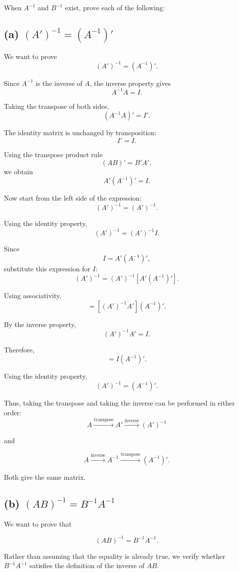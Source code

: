 \documentclass[12pt]{article}
\begin{document}
	When $A^{-1}$ and $B^{-1}$ exist, prove each of the following:
	
	\subsection*{(a) $(A')^{-1}=(A^{-1})'$}
	
	We want to prove
	\[
	\boxed{(A')^{-1}=(A^{-1})'}.
	\]
	
	Since $A^{-1}$ is the inverse of $A$, the inverse property gives
	\[
	A^{-1}A=I.
	\]
	
	Taking the transpose of both sides,
	\[
	(A^{-1}A)'=I'.
	\]
	
	The identity matrix is unchanged by transposition:
	\[
	I'=I.
	\]
	
	Using the transpose product rule
	\[
	(AB)'=B'A',
	\]
	we obtain
	\[
	\boxed{A'(A^{-1})'=I}.
	\]
	
	Now start from the left side of the expression:
	\[
	(A')^{-1} = (A')^{-1} .
	\]
	
	Using the identity property,
	\[
	(A')^{-1}=(A')^{-1}I.
	\]
	
	Since
	\[
	I=A'(A^{-1})',
	\]
	substitute this expression for $I$:
	\[
	(A')^{-1}
	=
	(A')^{-1}\left[A'(A^{-1})'\right].
	\]
	
	Using associativity,
	\[
	=
	\left[(A')^{-1}A'\right](A^{-1})'.
	\]
	
	By the inverse property,
	\[
	(A')^{-1}A'=I.
	\]
	
	Therefore,
	\[
	=I(A^{-1})'.
	\]
	
	Using the identity property,
	\[
	\boxed{(A')^{-1}=(A^{-1})'}.
	\]
	
	Thus, taking the transpose and taking the inverse can be
	performed in either order:
	\[
	\boxed{
		A\xrightarrow{\text{transpose}}\!A'
		\xrightarrow{\text{inverse}}\!(A')^{-1}
	}
	\]
	
	and
	
	\[
	\boxed{
		A\xrightarrow{\text{inverse}}\!A^{-1}
		\xrightarrow{\text{transpose}}\!(A^{-1})'
	}.
	\]
	
	Both give the same matrix.
	
	\subsection*{(b) $(AB)^{-1}=B^{-1}A^{-1}$}
	
	We want to prove that
	
	\[
	\boxed{(AB)^{-1}=B^{-1}A^{-1}}.
	\]
	
	Rather than assuming that the equality is already true, we verify
	whether $B^{-1}A^{-1}$ satisfies the definition of the inverse of $AB$.
	
\end{document}
